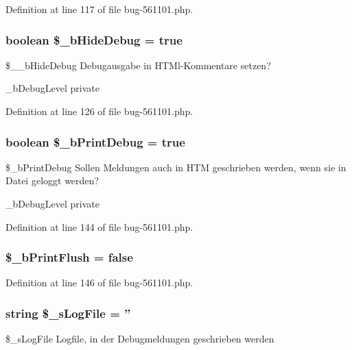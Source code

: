 \-Definition at line 117 of file bug-\/561101.\-php.

\hypertarget{class_club_base_ad7d93ce351d81c017e02c6f0298acd5d}{
\subsubsection[{\$\-\_\-b\-Hide\-Debug}]{\setlength{\rightskip}{0pt plus 5cm}boolean \$\-\_\-b\-Hide\-Debug = true}}\label{class_club_base_ad7d93ce351d81c017e02c6f0298acd5d}
\$\-\_\-\-\_\-b\-Hide\-Debug \-Debugausgabe in \-H\-T\-Ml-\/\-Kommentare setzen?

\-\_\-b\-Debug\-Level  private 

\-Definition at line 126 of file bug-\/561101.\-php.

\hypertarget{class_club_base_ab74e25f90ff7b6bd6057691b4f37e1ac}{
\subsubsection[{\$\-\_\-b\-Print\-Debug}]{\setlength{\rightskip}{0pt plus 5cm}boolean \$\-\_\-b\-Print\-Debug = true}}\label{class_club_base_ab74e25f90ff7b6bd6057691b4f37e1ac}
\$\-\_\-b\-Print\-Debug \-Sollen \-Meldungen auch in \-H\-T\-M geschrieben werden, wenn sie in \-Datei geloggt werden?

\-\_\-b\-Debug\-Level  private 

\-Definition at line 144 of file bug-\/561101.\-php.

\hypertarget{class_club_base_ad948cd5f705e9a44794823715ba6b164}{
\subsubsection[{\$\-\_\-b\-Print\-Flush}]{\setlength{\rightskip}{0pt plus 5cm}\$\-\_\-b\-Print\-Flush = false}}\label{class_club_base_ad948cd5f705e9a44794823715ba6b164}


\-Definition at line 146 of file bug-\/561101.\-php.

\hypertarget{class_club_base_adb79a07a3a72f42e63e7158496181177}{
\subsubsection[{\$\-\_\-s\-Log\-File}]{\setlength{\rightskip}{0pt plus 5cm}string \$\-\_\-s\-Log\-File = ''}}\label{class_club_base_adb79a07a3a72f42e63e7158496181177}
\$\-\_\-s\-Log\-File \-Logfile, in der \-Debugmeldungen geschrieben werden

